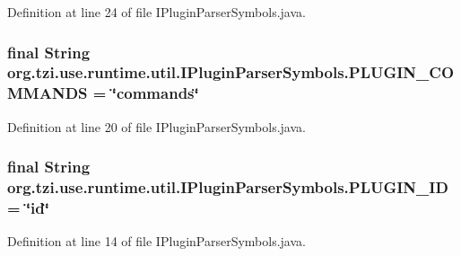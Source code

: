 Definition at line 24 of file I\-Plugin\-Parser\-Symbols.\-java.

\hypertarget{interfaceorg_1_1tzi_1_1use_1_1runtime_1_1util_1_1_i_plugin_parser_symbols_af90cdf852fbda405d20f0393d3810a01}{
\subsubsection[{P\-L\-U\-G\-I\-N\-\_\-\-C\-O\-M\-M\-A\-N\-D\-S}]{\setlength{\rightskip}{0pt plus 5cm}final String org.\-tzi.\-use.\-runtime.\-util.\-I\-Plugin\-Parser\-Symbols.\-P\-L\-U\-G\-I\-N\-\_\-\-C\-O\-M\-M\-A\-N\-D\-S = \char`\"{}commands\char`\"{}\hspace{0.3cm}{\ttfamily [static]}}}\label{interfaceorg_1_1tzi_1_1use_1_1runtime_1_1util_1_1_i_plugin_parser_symbols_af90cdf852fbda405d20f0393d3810a01}


Definition at line 20 of file I\-Plugin\-Parser\-Symbols.\-java.

\hypertarget{interfaceorg_1_1tzi_1_1use_1_1runtime_1_1util_1_1_i_plugin_parser_symbols_a1c7f0fdc15a7fd97cebdca3c8d04b3b1}{
\subsubsection[{P\-L\-U\-G\-I\-N\-\_\-\-I\-D}]{\setlength{\rightskip}{0pt plus 5cm}final String org.\-tzi.\-use.\-runtime.\-util.\-I\-Plugin\-Parser\-Symbols.\-P\-L\-U\-G\-I\-N\-\_\-\-I\-D = \char`\"{}id\char`\"{}\hspace{0.3cm}{\ttfamily [static]}}}\label{interfaceorg_1_1tzi_1_1use_1_1runtime_1_1util_1_1_i_plugin_parser_symbols_a1c7f0fdc15a7fd97cebdca3c8d04b3b1}


Definition at line 14 of file I\-Plugin\-Parser\-Symbols.\-java.

